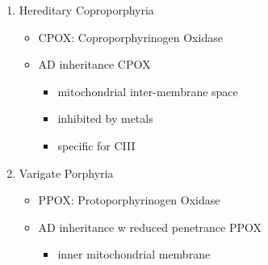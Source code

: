 \documentclass{scrartcl}
\begin{document}
\begin{enumerate}
\item Hereditary Coproporphyria
\label{sec:orgf837ed6}
\begin{itemize}
\item CPOX: Coproporphyrinogen Oxidase
\item AD inheritance CPOX
\begin{itemize}
\item mitochondrial inter-membrane space
\item inhibited by metals
\item specific for CIII
\end{itemize}
\end{itemize}

\item Varigate Porphyria
\label{sec:orgcf0122a}
\begin{itemize}
\item PPOX: Protoporphyrinogen Oxidase
\item AD inheritance w reduced penetrance PPOX

\begin{itemize}
\item inner mitochondrial membrane
\end{itemize}
\end{itemize}
\end{enumerate}
\end{document}
